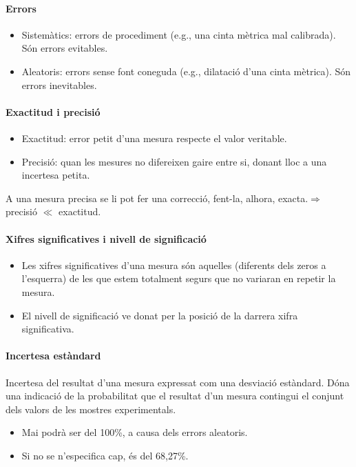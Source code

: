 \paragraph{Errors}
\begin{itemize}
    \item Sistemàtics: errors de procediment (e.g., una cinta mètrica mal calibrada). Són errors evitables.
    \item Aleatoris: errors sense font coneguda (e.g., dilatació d'una cinta mètrica). Són errors inevitables.
\end{itemize}

\paragraph{Exactitud i precisió}
\begin{itemize}
    \item Exactitud: error petit d'una mesura respecte el valor veritable.
    \item Precisió: quan les mesures no difereixen gaire entre si, donant lloc a una incertesa petita. 
\end{itemize}
A una mesura precisa se li pot fer una correcció, fent-la, alhora, exacta.$\Rightarrow$ precisió $\ll$ exactitud.

\paragraph{Xifres significatives i nivell de significació}
\begin{itemize}
    \item Les xifres significatives d’una mesura són aquelles (diferents dels zeros a l’esquerra) de les que estem totalment segurs que no variaran en repetir la mesura.
    \item El nivell de significació ve donat per la posició de la darrera xifra significativa.
\end{itemize}

\paragraph{Incertesa estàndard}
Incertesa del resultat d’una mesura expressat com una desviació estàndard. Dóna una indicació de la probabilitat que el resultat d'un mesura contingui el conjunt dels valors de les mostres experimentals.
\begin{itemize}
    \item Mai podrà ser del 100\%, a causa dels errors aleatoris. 
    \item Si no se n'especifica cap, és del 68,27\%.
\end{itemize}

